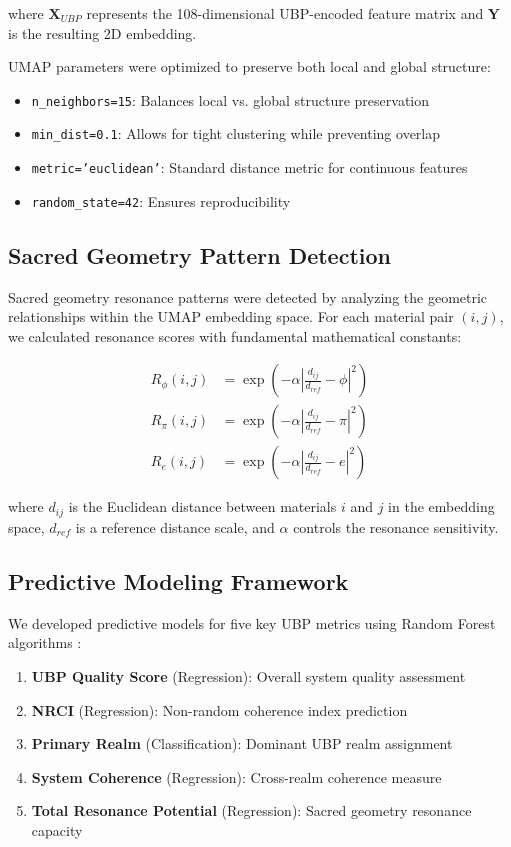 \documentclass[12pt,a4paper]{article}
\begin{document}
where $\mathbf{X}_{UBP}$ represents the 108-dimensional UBP-encoded feature matrix and $\mathbf{Y}$ is the resulting 2D embedding.

UMAP parameters were optimized to preserve both local and global structure:
\begin{itemize}
    \item \texttt{n\_neighbors=15}: Balances local vs. global structure preservation
    \item \texttt{min\_dist=0.1}: Allows for tight clustering while preventing overlap
    \item \texttt{metric='euclidean'}: Standard distance metric for continuous features
    \item \texttt{random\_state=42}: Ensures reproducibility
\end{itemize}

\subsection{Sacred Geometry Pattern Detection}

Sacred geometry resonance patterns were detected by analyzing the geometric relationships within the UMAP embedding space. For each material pair $(i,j)$, we calculated resonance scores with fundamental mathematical constants:

\begin{align}
R_{\phi}(i,j) &= \exp\left(-\alpha \left|\frac{d_{ij}}{d_{ref}} - \phi\right|^2\right) \\
R_{\pi}(i,j) &= \exp\left(-\alpha \left|\frac{d_{ij}}{d_{ref}} - \pi\right|^2\right) \\
R_{e}(i,j) &= \exp\left(-\alpha \left|\frac{d_{ij}}{d_{ref}} - e\right|^2\right)
\end{align}

where $d_{ij}$ is the Euclidean distance between materials $i$ and $j$ in the embedding space, $d_{ref}$ is a reference distance scale, and $\alpha$ controls the resonance sensitivity.

\subsection{Predictive Modeling Framework}

We developed predictive models for five key UBP metrics using Random Forest algorithms \cite{breiman2001random}:

\begin{enumerate}
    \item \textbf{UBP Quality Score} (Regression): Overall system quality assessment
    \item \textbf{NRCI} (Regression): Non-random coherence index prediction
    \item \textbf{Primary Realm} (Classification): Dominant UBP realm assignment
    \item \textbf{System Coherence} (Regression): Cross-realm coherence measure
    \item \textbf{Total Resonance Potential} (Regression): Sacred geometry resonance capacity
\end{enumerate}
\end{document}
